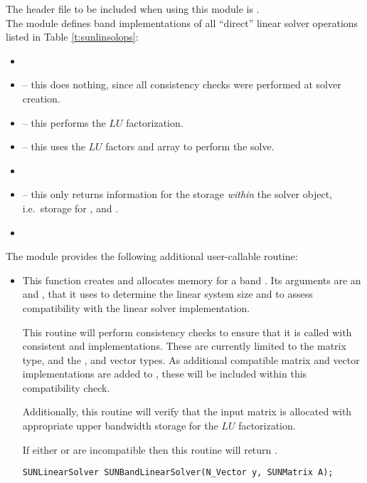\noindent The header file to be included when using this module 
is . \\
The {\sunlinsolband} module defines band implementations of all
``direct'' linear solver operations listed in
Table \ref{t:sunlinsolops}:
\begin{itemize}
\item {}
\item {} -- this does nothing, since all
  consistency checks were performed at solver creation.
\item {} -- this performs the $LU$ factorization.
\item {} -- this uses the $LU$ factors
  and  array to perform the solve.
\item {}
\item {} -- this only returns information for
  the storage \emph{within} the solver object, i.e.~storage
  for ,  and .
\item {}
\end{itemize}
The module {\sunlinsolband} provides the following additional
user-callable routine: 
\begin{itemize}


\item {}

  This function creates and allocates memory for a band .
  Its arguments are an {\nvector} and {\sunmatrix}, that it uses to
  determine the linear system size and to assess compatibility with
  the linear solver implementation.

  This routine will perform consistency checks to ensure that it is
  called with consistent {\nvector} and {\sunmatrix} implementations.
  These are currently limited to the {\sunmatband} matrix type, and
  the {\nvecs}, {\nvecopenmp} and {\nvecpthreads} vector types.  As
  additional compatible matrix and vector implementations are added to
  {\sundials}, these will be included within this compatibility check.

  Additionally, this routine will verify that the input matrix 
  is allocated with appropriate upper bandwidth storage for the $LU$
  factorization.

  If either  or  are incompatible then this routine will
  return .

  \verb|SUNLinearSolver SUNBandLinearSolver(N_Vector y, SUNMatrix A);|

\end{itemize}
